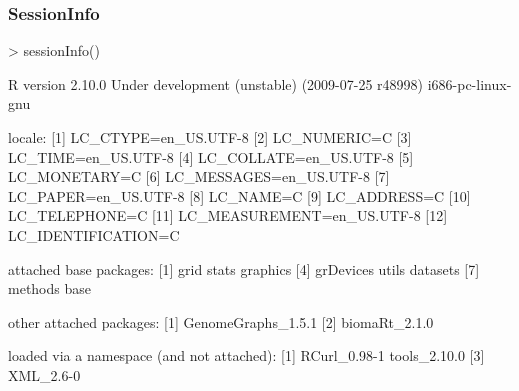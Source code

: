 \begin{frame}
  \frametitle{SessionInfo} \scriptsize
\begin{Schunk}
\begin{Sinput}
> sessionInfo()
\end{Sinput}
\begin{Soutput}
R version 2.10.0 Under development (unstable) (2009-07-25 r48998) 
i686-pc-linux-gnu 

locale:
 [1] LC_CTYPE=en_US.UTF-8      
 [2] LC_NUMERIC=C              
 [3] LC_TIME=en_US.UTF-8       
 [4] LC_COLLATE=en_US.UTF-8    
 [5] LC_MONETARY=C             
 [6] LC_MESSAGES=en_US.UTF-8   
 [7] LC_PAPER=en_US.UTF-8      
 [8] LC_NAME=C                 
 [9] LC_ADDRESS=C              
[10] LC_TELEPHONE=C            
[11] LC_MEASUREMENT=en_US.UTF-8
[12] LC_IDENTIFICATION=C       

attached base packages:
[1] grid      stats     graphics 
[4] grDevices utils     datasets 
[7] methods   base     

other attached packages:
[1] GenomeGraphs_1.5.1
[2] biomaRt_2.1.0     

loaded via a namespace (and not attached):
[1] RCurl_0.98-1 tools_2.10.0
[3] XML_2.6-0   
\end{Soutput}
\end{Schunk}
\end{frame}



